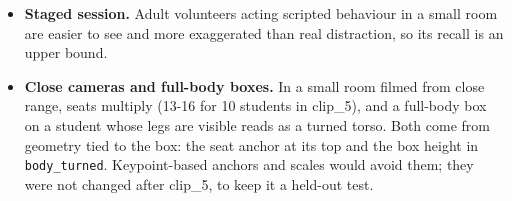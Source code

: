 \begin{itemize}
\item
  \textbf{Staged session.} Adult volunteers acting scripted behaviour in a small room are easier to see and more exaggerated than real distraction, so its recall is an upper bound.
\item
  \textbf{Close cameras and full-body boxes.} In a small room filmed from close range, seats multiply (13-16 for 10 students in clip\_5), and a full-body box on a student whose legs are visible reads as a turned torso. Both come from geometry tied to the box: the seat anchor at its top and the box height in \texttt{body\_turned}. Keypoint-based anchors and scales would avoid them; they were not changed after clip\_5, to keep it a held-out test.
\end{itemize}
